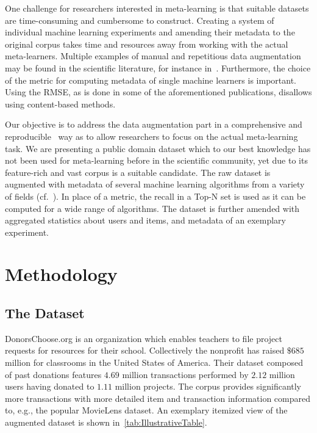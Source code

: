 \documentclass[runningheads]{llncs}
\begin{document}
One challenge for researchers interested in meta-learning is that suitable datasets are time-consuming and cumbersome to construct. Creating a system of individual machine learning experiments and amending their metadata to the original corpus takes time and resources away from working with the actual meta-learners. Multiple examples of manual and repetitious data augmentation may be found in the scientific literature, for instance in~\cite{CUNHA2018128,DBLP:journals/corr/abs-1805-12118,Ekstrand:2012:RFP:2365952.2366002}. Furthermore, the choice of the metric for computing metadata of single machine learners is important. Using the RMSE, as is done in some of the aforementioned publications, disallows using content-based methods.

Our objective is to address the data augmentation part in a comprehensive and reproducible~\cite{UMUAI:TowardsReproducibilityInRecSysBeel2016} way as to allow researchers to focus on the actual meta-learning task. We are presenting a public domain dataset which to our best knowledge has not been used for meta-learning before in the scientific community, yet due to its feature-rich and vast corpus is a suitable candidate. The raw dataset is augmented with metadata of several machine learning algorithms from a variety of fields (cf.~\cite{DBLP:journals/corr/abs-1805-12118}). In place of a metric, the recall in a Top-N set is used as it can be computed for a wide range of algorithms. The dataset is further amended with aggregated statistics about users and items, and metadata of an exemplary experiment.

\section{Methodology}

\subsection{The Dataset}
DonorsChoose.org is an organization which enables teachers to file project requests for resources for their school. Collectively the nonprofit has raised $\$685$ million for classrooms in the United States of America. Their dataset composed of past donations features $4.69$ million transactions performed by $2.12$ million users having donated to $1.11$ million projects. The corpus provides significantly more transactions with more detailed item and transaction information compared to, e.g., the popular MovieLens dataset. An exemplary itemized view of the augmented dataset is shown in~\autoref{tab:IllustrativeTable}.
\end{document}
